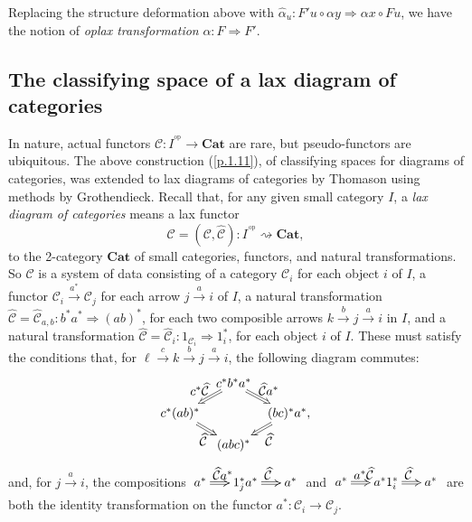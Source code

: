 \documentclass[]{amsart}
\begin{document}
Replacing the structure deformation above with $\widehat{\alpha}_u: F'\!u\circ \alpha y\Rightarrow
\alpha x\circ Fu$, we have the notion of {\em oplax transformation} $\alpha:F\Rightarrow F'$.

\subsection{The classifying space of a lax diagram of categories}
In nature, actual functors ${\mathcal C}:I^{^{\mathrm{op}}}\to {\ensuremath{\mathbf{Cat}}}$ are rare, but pseudo-functors
are ubiquitous. The above construction (\ref{p.1.11}), of classifying spaces for diagrams of
categories, was extended to lax diagrams of categories by Thomason \cite{thomason} using methods by
Grothendieck. Recall that, for any given small category $I$,  a {\em lax diagram of categories}
means a lax functor
$${\ensuremath{\mathcal{C}}}=({\ensuremath{\mathcal{C}}},\widehat{\ensuremath{\mathcal{C}}}):I^{^{\,\mathrm{op}}} \rightsquigarrow{\ensuremath{\mathbf{Cat}}},$$  to the 2-category ${\ensuremath{\mathbf{Cat}}}$ of small categories, functors, and natural transformations. So ${\ensuremath{\mathcal{C}}}$ is a system of data consisting of a category ${\ensuremath{\mathcal{C}}}_i$ for each object $i$ of $I$, a functor
${\ensuremath{\mathcal{C}}}_i\overset{a^*}\to {\ensuremath{\mathcal{C}}}_j$ for each arrow $j\overset{a}\to i$ of $I$, a natural transformation
$\widehat{\ensuremath{\mathcal{C}}}=\widehat{\ensuremath{\mathcal{C}}}_{a,b}:b^*a^*\Rightarrow (ab)^*$, for each two composible arrows
$k\overset{b}\to j\overset{a}\to i$ in  $I$, and a natural transformation
$\widehat{\ensuremath{\mathcal{C}}}=\widehat{\ensuremath{\mathcal{C}}}_i:1_{{\ensuremath{\mathcal{C}}}_i}\Rightarrow 1_i^*$, for each object $i$ of $I$. These must
satisfy the conditions that, for $\ell \overset{c}\to k\overset{b}\to j \overset{a}\to i$, the
following diagram commutes:
$$\xymatrix@C=7pt@R=9pt{&c^*b^*a^*\ar@2{->}[dl]_{\textstyle c^*\widehat{\ensuremath{\mathcal{C}}}}
\ar@2{->}[dr]^{\textstyle \widehat{\ensuremath{\mathcal{C}}} a^*
}&\\
c^*(ab)^*\ar@2{->}[dr]_{\textstyle ~\widehat{\ensuremath{\mathcal{C}}}}& &(bc)^*a^*
\ar@2{->}[dl]^{\textstyle ~\widehat{\ensuremath{\mathcal{C}}}},\\
&(abc)^*&}
$$
and, for $j\overset{a}\to i$, the compositions $\xymatrix@C=15pt{a^*\ar@{=>}[r]^{\textstyle
\widehat{\ensuremath{\mathcal{C}}} a^*}&1_j^*a^*\ar@{=>}[r]^{\textstyle \widehat{\ensuremath{\mathcal{C}}}}&a^*}$ and
$\xymatrix@C=15pt{a^*\ar@{=>}[r]^{\textstyle a^*\widehat{\ensuremath{\mathcal{C}}}}&a^*1_i^*\ar@{=>}[r]^{\textstyle
\widehat{\ensuremath{\mathcal{C}}}}&a^*}$ are both the identity transformation on the functor $a^*:{\ensuremath{\mathcal{C}}}_i\to{\ensuremath{\mathcal{C}}}_j$.
\end{document}
